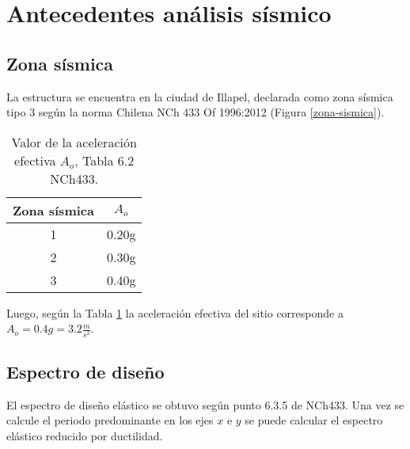 \newpage
\section{Antecedentes análisis sísmico}

\subsection{Zona sísmica}

La estructura se encuentra en la ciudad de Illapel, declarada como zona sísmica tipo 3 según la norma Chilena NCh 433 Of 1996:2012 (Figura \ref{zona-sismica}).


\begin{table}[H]
  \centering
  \caption{Valor de la aceleración efectiva $A_o$, Tabla 6.2 NCh433.}
    \begin{tabular}{|c|c|}
    \hline
    \textbf{Zona sísmica} & \boldmath{}\textbf{$A_o$}\unboldmath{} \bigstrut\\
    \hline
    1     & 0.20g \bigstrut[t]\\
    2     & 0.30g \\
    3     & 0.40g \bigstrut[b]\\
    \hline
    \end{tabular}%
  \label{tab:zonasismicaAo}%
\end{table}%

Luego, según la Tabla \ref{tab:zonasismicaAo} la aceleración efectiva del sitio corresponde a $A_o=0.4g=3.2 \frac{m}{s^2}$.

\subsection{Espectro de diseño}

El espectro de diseño elástico se obtuvo según punto 6.3.5 de NCh433. Una vez se calcule el periodo predominante en los ejes $x$ e $y$ se puede calcular el espectro elástico reducido por ductilidad.

